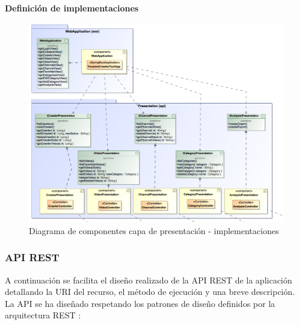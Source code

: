 \documentclass[11pt,a4paper]{article}
\begin{document}
\noindent\textbf{Definición de implementaciones}
\begin{figure}[H]
\centering
\includegraphics[scale=0.25]{diseno/presentacion/ComponentDiagram3.png}
\caption{Diagrama de componentes capa de presentación - implementaciones}
\end{figure}

\subsubsection{API REST}
A continuación se facilita el diseño realizado de la API REST de la aplicación detallando la URI del recurso, el método de ejecución y una breve descripción.
\\

La API se ha diseñado respetando los patrones de diseño definidos por la arquitectura REST \cite{20}:
\\
\end{document}
